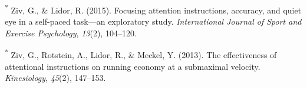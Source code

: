 \documentclass[
  man, donotrepeattitle,floatsintext]{apa7}
\newlength{\cslhangindent}
\newlength{\cslentryspacingunit} %
\newenvironment{CSLReferences}[2] %
 {%
  \setlength{\parindent}{0pt}
  \ifodd #1
  \let\oldpar\par
  \def\par{\hangindent=\cslhangindent\oldpar}
  \fi
  \setlength{\parskip}{#2\cslentryspacingunit}
 }%
 {}
\begin{document}
\begin{CSLReferences}{1}{0}
\leavevmode{}%
\textsuperscript{*} Ziv, G., \& Lidor, R. (2015). Focusing attention instructions, accuracy, and quiet eye in a self-paced task---an exploratory study. \emph{International Journal of Sport and Exercise Psychology}, \emph{13}(2), 104--120.

\leavevmode{}%
\textsuperscript{*} Ziv, G., Rotstein, A., Lidor, R., \& Meckel, Y. (2013). The effectiveness of attentional instructions on running economy at a submaximal velocity. \emph{Kinesiology}, \emph{45}(2), 147--153.

\end{CSLReferences}
\end{document}
